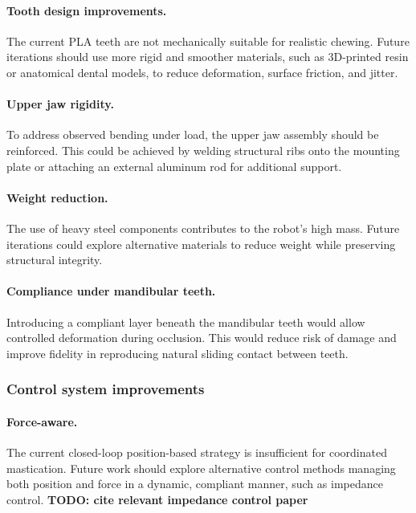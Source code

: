 \paragraph{Tooth design improvements.}  
The current PLA teeth are not mechanically suitable for realistic chewing. Future iterations should use more rigid and smoother materials, such as 3D-printed resin or 
anatomical dental models, to reduce deformation, surface friction, and jitter.

\paragraph{Upper jaw rigidity.}  
To address observed bending under load, the upper jaw assembly should be reinforced. This could be achieved by welding structural ribs onto the mounting plate or attaching 
an external aluminum rod for additional support.

\paragraph{Weight reduction.}  
The use of heavy steel components contributes to the robot's high mass. Future iterations could explore alternative materials to reduce weight while preserving structural integrity.

\paragraph{Compliance under mandibular teeth.}  
Introducing a compliant layer beneath the mandibular teeth would allow controlled deformation during occlusion. This would reduce risk of damage and improve fidelity 
in reproducing natural sliding contact between teeth.

\subsubsection{Control system improvements}

\paragraph{Force-aware.}  
The current closed-loop position-based strategy is insufficient for coordinated mastication. Future work should explore alternative control methods managing both position and force in a 
dynamic, compliant manner, such as impedance control. 
\textbf{TODO: cite relevant impedance control paper}


